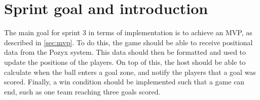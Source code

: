 \section{Sprint goal and introduction}
The main goal for sprint 3 in terms of implementation is to achieve an MVP, as described in \autoref{sec:mvp}.
To do this, the game should be able to receive positional data from the Pozyx system.
This data should then be formatted and used to update the positions of the players.
On top of this, the host should be able to calculate when the ball enters a goal zone, and notify the players that a goal was scored.
Finally, a win condition should be implemented such that a game can end, such as one team reaching three goals scored.
